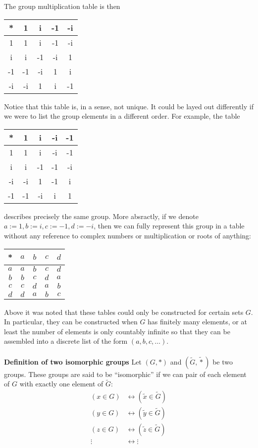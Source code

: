 \documentclass[12 pt]{article}
\numberwithin{equation}{section}
\begin{document}
The group multiplication table is then
\begin{center}
\begin{tabular}{c | c c c c}
* & 1 & i & -1 & -i \\
\hline
1 & 1 & i & -1 & -i \\
i & i & -1 & -i & 1 \\
-1 & -1 & -i & 1 & i \\
-i & -i & 1 & i & -1
\end{tabular}
\end{center}
Notice that this table is, in a sense, not unique. It could be layed out differently if we were to list the group elements in a different order. For example, the table
\begin{center}
\begin{tabular}{c | c c c c}
* & 1 & i & -i & -1 \\
\hline
1 & 1 & i & -i & -1 \\
i & i & -1 & -1 & -i \\
-i & -i & 1 & -1 & i \\
-1 & -1 & -i & i & 1
\end{tabular}
\end{center}
describes precisely the same group. More absractly, if we denote $a:= 1, b:= i, c:= -1, d := -i$, then we can fully represent this group in a table without any reference to complex numbers or multiplication or roots of anything:
\begin{center}
\begin{tabular}{c | c c c c}
* & $a$ & $b$ & $c$ & $d$ \\
\hline
$a$ & $a$ & $b$ & $c$ & $d$ \\
$b$ & $b$ & $c$ & $d$ & $a$ \\
$c$ & $c$ & $d$ & $a$ & $b$ \\
$d$ & $d$ & $a$ & $b$ & $c$
\end{tabular}
\end{center}
Above it was noted that these tables could only be constructed for certain sets $G$. In particular, they can be constructed when $G$ has finitely many elements, or at least the number of elements is only countably infinite so that they can be assembled into a discrete list of the form $(a,b,c,\ldots)$.\\
\\
\textbf{Definition of two isomorphic groups} Let $(G, *)$ and $\left(\tilde{G}, \tilde{*} \right)$ be two groups. These groups are said to be ``isomorphic'' if we can pair of each element of $G$ with exactly one element of $\tilde{G}$: \begin{align*}
\left( x \in G \right) & \leftrightarrow \left( \tilde{x} \in \tilde{G} \right) \\
\left( y \in G \right) & \leftrightarrow \left( \tilde{y} \in \tilde{G} \right) \\
\left( z \in G \right) & \leftrightarrow \left( \tilde{z} \in \tilde{G} \right) \\
\vdots & \leftrightarrow \vdots
\end{align*}
\end{document}
